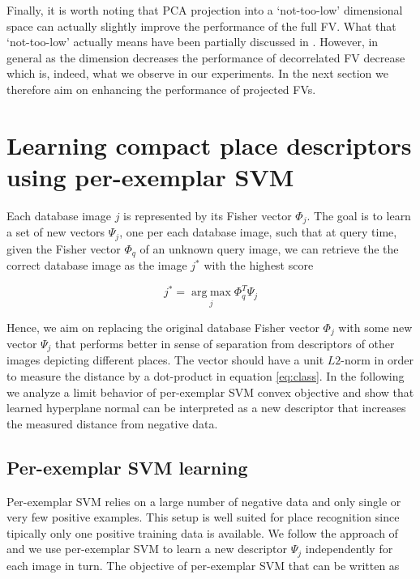 \documentclass[table]{article} %
\begin{document}
			Finally, it is worth noting that PCA projection into a `not-too-low' dimensional space can actually slightly improve the performance of the full FV. What that `not-too-low' actually means have been partially discussed in \cite{Jegou2012HAL}. However, in general as the dimension decreases the performance of decorrelated FV decrease which is, indeed, what we observe in our experiments. In the next section we therefore aim on enhancing the performance of projected FVs.   


\section{Learning compact place descriptors using per-exemplar SVM}
\label{sec:perExemplar}
	Each database image $j$ is represented by its Fisher vector $\Phi_j$. The goal is to learn a set of new vectors $\Psi_j$, one per each database image, such that at query time, given the Fisher vector $\Phi_q$ of an unknown query image, we can retrieve the the correct database image as the image $j^*$ with the highest score

	\begin{equation}
	    j^*=\operatorname*{arg\;max}_{j} \Phi_q^T \Psi_j 
	    \label{eq:class}
	\end{equation}

	Hence, we aim on replacing the original database Fisher vector $\Phi_j$ with some new vector $\Psi_j$ that performs better in sense of separation from descriptors of other images depicting different places. The vector should have a unit $L2$-norm in order to measure the distance by a dot-product in equation \eqref{eq:class}. In the following we analyze a limit behavior of per-exemplar SVM convex objective and show that learned hyperplane normal can be interpreted as a new descriptor that increases the measured distance from negative data.


	\subsection*{Per-exemplar SVM learning}\vspace{-0.2cm}
        Per-exemplar SVM relies on a large number of negative data and only single or very few positive examples. This setup is well suited for place recognition since tipically only one positive training data is available. We follow the approach of \cite{Gronat2013} and we use per-exemplar SVM to learn a new descriptor $\Psi_j$ independently for each image in turn. The objective of per-exemplar SVM that can be written as 
\end{document}
